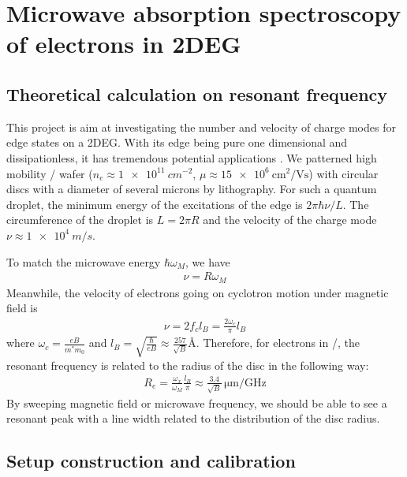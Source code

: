 \documentclass[12pt]{ruthesis}
\begin{document}
\chapter{Microwave absorption spectroscopy of electrons in 2DEG}\label{Absorption}

\section{Theoretical calculation on resonant frequency}
This project is aim at investigating the number and velocity of charge modes for edge states on a 2DEG.
With its edge being pure one dimensional and dissipationless, it has tremendous potential applications \cite{PhysRevB.88.165305}.
We patterned high mobility / wafer ($n_{e} \approx \SI{1e11}{cm^{-2}}$, $\mu \approx \SI{15 e6}{\cm^{2}/\volt \second}$) with circular discs with a diameter of several microns by lithography. 
For such a quantum droplet, the minimum energy of the excitations of the edge is $2\pi \hbar \nu /L$. 
The circumference of the droplet is $L=2\pi R$ and the velocity of the charge mode $\nu \approx \SI{1e4}{m/s}$.

To match the microwave energy $\hbar \omega_{M}$, we have 
\begin{align}
\nu = R \omega_{M}
\end{align}
Meanwhile, the velocity of electrons going on cyclotron motion under magnetic field is 
\begin{align}
\nu = 2 f_{c} l_{B}= \frac{2 \omega_{c}}{\pi} l_{B} 
\end{align}
where $\displaystyle \omega_{c}= \frac{eB}{m^{\ast}m_{0}}$ and $\displaystyle l_{B}=\sqrt{\frac{\hbar}{eB}} \approx \frac{257}{\sqrt{B}} \si{\angstrom}$.
Therefore, for electrons in /, the resonant frequency is related to the radius of the disc in the following way:
\begin{align}
R_{e}= \frac{\omega_{x}}{\omega_{M}} \frac{l_{B}}{\pi} \approx \frac{3.4}{\sqrt{B}} \, \si{\micro\meter/\giga\hertz}
\end{align}
By sweeping magnetic field or microwave frequency, we should be able to see a resonant peak with a line width related to the distribution of the disc radius. 


\section{Setup construction and calibration}\label{Construction}
\end{document}
